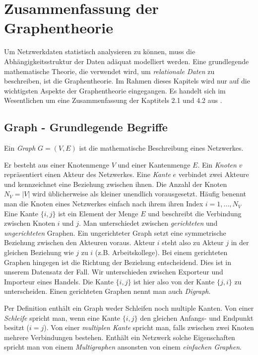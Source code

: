 \documentclass[a4paper,ngerman,oneside,titlepage,bibliography=totoc,11pt]{scrreprt}
\begin{document}
\section{Zusammenfassung der Graphentheorie}

Um Netzwerkdaten statistisch analysieren zu können, muss die Abhängigkeitsstruktur der Daten adäquat modelliert werden. Eine grundlegende mathematische Theorie, die verwendet wird, um \emph{relationale Daten} zu beschreiben, ist die Graphentheorie. Im Rahmen dieses Kapitels wird nur auf die wichtigsten Aspekte der Graphentheorie eingegangen. Es handelt sich im Wesentlichen um eine Zusammenfassung der Kaptitels 2.1 und 4.2 aus \citet{kol09}.

\subsection{Graph - Grundlegende Begriffe}

Ein \emph{Graph} $G = (V,E)$ ist die mathematische Beschreibung eines Netzwerkes. 

Er besteht aus einer Knotenmenge $V$ und einer Kantenmenge $E$. Ein \emph{Knoten} $v$ repräsentiert einen Akteur des Netzwerkes. Eine \emph{Kante} $e$ verbindet zwei Akteure und kennzeichnet eine Beziehung zwischen ihnen.
Die Anzahl der Knoten $N_V = |V|$ wird üblicherweise als kleiner unendlich vorausgesetzt. Häufig benennt man die Knoten eines Netzwerkes einfach nach ihrem ihren Index $i = 1, ..., N_V$
Eine Kante $\{i,j\}$ ist ein Element der Menge $E$ und  beschreibt die Verbindung zwischen Knoten $i$ und $j$. 
Man unterschiedet zwischen \emph{gerichteten} und \emph{ungerichteten} Graphen. Ein ungerichteter Graph setzt eine symmetrische Beziehung zwischen den Akteuren voraus. Akteur $i$ steht also zu Akteur $j$ in der gleichen Beziehung wie $j$ zu $i$ (z.B. Arbeitskollege). Bei einem gerichteten Graphen hingegen ist die Richtung der Beziehung entscheidend. Dies ist in unserem Datensatz der Fall. Wir unterschieden zwischen Exporteur und Importeur eines Handels. Die Kante $\{i,j\}$ ist hier also von der Kante $\{j,i\}$ zu unterscheiden. Einen gerichteten Graphen nennt man auch \emph{Digraph}.

Per Definition enthält ein Graph weder Schleifen noch multiple Kanten. Von einer \emph{Schleife} spricht man, wenn eine Kante $\{i,j\}$ den gleichen Anfangs- und Endpunkt besitzt ($i = j$). Von einer \emph{multiplen Kante} spricht man, falls zwischen zwei Knoten mehrere Verbindungen bestehen. Enthält ein Netzwerk solche Eigenschaften spricht man von einem \emph{Multigraphen} ansonsten von einem \emph{einfachen Graphen}.
\end{document}

